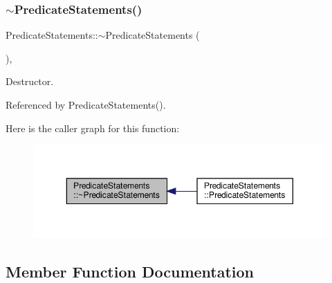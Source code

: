 \subsubsection{\texorpdfstring{$\sim$\+Predicate\+Statements()}{~PredicateStatements()}}
{\footnotesize\ttfamily Predicate\+Statements\+::$\sim$\+Predicate\+Statements (\begin{DoxyParamCaption}{ }\end{DoxyParamCaption})\hspace{0.3cm}{\ttfamily [override]}, {\ttfamily [default]}}



Destructor. 



Referenced by Predicate\+Statements().

Here is the caller graph for this function\+:
\nopagebreak
\begin{figure}[H]
\begin{center}
\leavevmode
\includegraphics[width=350pt]{d5/d46/classPredicateStatements_aa1b3c1e71c8fbc438a8867c1610a6bd6_icgraph}
\end{center}
\end{figure}


\subsection{Member Function Documentation}
\mbox{\label{classPredicateStatements_a28bd4193c0bfa7f18a95d54dab7e3c47}} 
